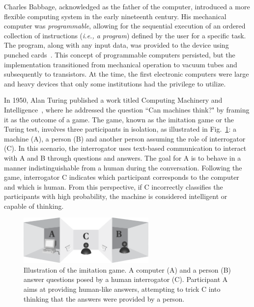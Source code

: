 Charles Babbage, acknowledged as the father of the computer, introduced a more flexible computing system in the early nineteenth century. His mechanical computer was \textit{programmable}, allowing for the sequential execution of an ordered collection of instructions (\textit{i.e., a program}) defined by the user for a specific task. The program, along with any input data, was provided to the device using punched cards~\cite{kim1999ada}. This concept of programmable computers persisted, but the implementation transitioned from mechanical operation to vacuum tubes and subsequently to transistors. At the time, the first electronic computers were large and heavy devices that only some institutions had the privilege to utilize. 

In 1950, Alan Turing published a work titled Computing Machinery and Intelligence~\cite{turing2009computing}, where he addressed the question ``Can machines think?" by framing it as the outcome of a game. The game, known as the imitation game or the Turing test, involves three participants in isolation, as illustrated in Fig.~\ref{fig:imitation_game}: a machine (A), a person (B) and another person assuming the role of interrogator (C). In this scenario, the interrogator uses text-based communication to interact with A and B through questions and answers. The goal for A is to behave in a manner indistinguishable from a human during the conversation. Following the game, interrogator C indicates which participant corresponds to the computer and which is human. From this perspective, if C incorrectly classifies the participants with high probability, the machine is considered intelligent or capable of thinking.

\begin{figure}[!ht]
\begin{center}
\includegraphics[width=0.6\textwidth]{Figures/Introduction/imit_game.pdf}
\caption{Illustration of the imitation game. A computer (A) and a person (B) answer questions posed by a human interrogator (C). Participant A aims at providing human-like answers, attempting to trick C into thinking that the answers were provided by a person.}
\label{fig:imitation_game}
\end{center}
\end{figure}

